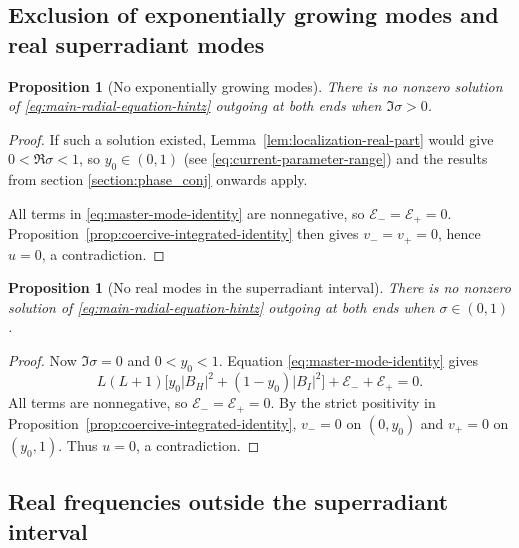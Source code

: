 \documentclass[11pt]{article}
\numberwithin{equation}{section}
\newtheorem{proposition}[theorem]{Proposition}
\begin{document}
	\subsection{Exclusion of exponentially growing modes and real superradiant modes}
	
	\begin{proposition}[No exponentially growing modes]
		\label{prop:no-upper-half-plane-modes}
		There is no nonzero solution of
		\eqref{eq:main-radial-equation-hintz} outgoing at both ends when
		$\Im\sigma>0$.
	\end{proposition}
	
	\begin{proof}
		If such a solution existed, Lemma~\ref{lem:localization-real-part}
		would give $0<\Re\sigma<1$, so $y_0 \in (0, 1)$ (see \eqref{eq:current-parameter-range}) and the results from section \ref{section:phase_conj} onwards apply.
		
		All terms in \eqref{eq:master-mode-identity} are nonnegative, so
		$\mathcal E_-=\mathcal E_+=0$. Proposition~\ref{prop:coercive-integrated-identity}
		then gives $v_-=v_+=0$, hence $u=0$, a contradiction.
		
		
	\end{proof}
	
	\begin{proposition}[No real modes in the superradiant interval]
		\label{prop:no-real-superradiant-modes}
		There is no nonzero solution of
		\eqref{eq:main-radial-equation-hintz} outgoing at both ends when
		$\sigma\in(0,1)$.
	\end{proposition}
	
	\begin{proof}
		Now $\Im\sigma=0$ and $0<y_0<1$. Equation
		\eqref{eq:master-mode-identity} gives
		\[
		L(L+1)\bigl[y_0|B_H|^2+(1-y_0)|B_I|^2\bigr]
		+\mathcal E_-+\mathcal E_+=0.
		\]
		All terms are nonnegative, so $\mathcal E_-=\mathcal E_+=0$. By the strict
		positivity in Proposition~\ref{prop:coercive-integrated-identity},
		$v_-=0$ on $(0,y_0)$ and $v_+=0$ on $(y_0,1)$. Thus $u=0$,
		a contradiction.
	\end{proof}
	
	\subsection{Real frequencies outside the superradiant interval}\label{section:real_not_superr}
	
\end{document}

